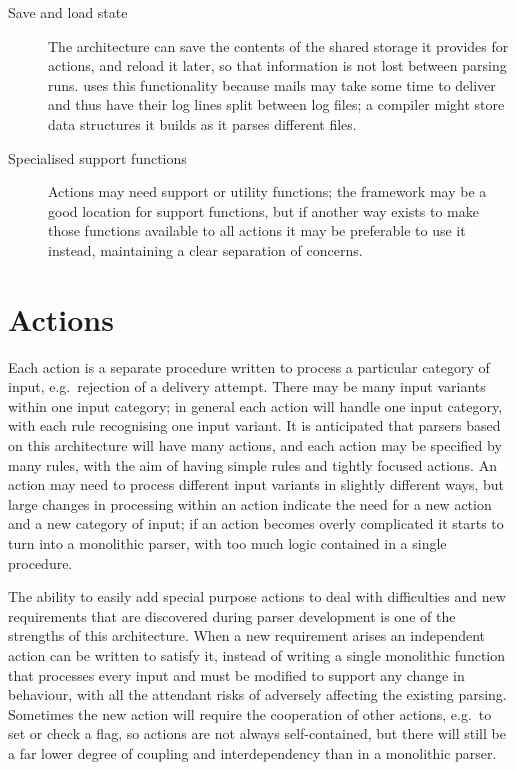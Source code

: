 \begin{description}
    \item [Save and load state]  The architecture can save the contents of
        the shared storage it provides for actions, and reload it later, so
        that information is not lost between parsing runs.  \parsername{}
        uses this functionality because mails may take some time to deliver
        and thus have their log lines split between log files; a compiler
        might store data structures it builds as it parses different files.

    \item [Specialised support functions]  Actions may need support or
        utility functions; the framework may be a good location for support
        functions, but if another way exists to make those functions
        available to all actions it may be preferable to use it instead,
        maintaining a clear separation of concerns.

\end{description}

\section{Actions}

\label{actions in architecture}

Each action is a separate procedure written to process a particular
category of input, e.g.\ rejection of a delivery attempt.  There may be
many input variants within one input category; in general each action will
handle one input category, with each rule recognising one input variant.
It is anticipated that parsers based on this architecture will have many
actions, and each action may be specified by many rules, with the aim of
having simple rules and tightly focused actions.  An action may need to
process different input variants in slightly different ways, but large
changes in processing within an action indicate the need for a new action
and a new category of input; if an action becomes overly complicated it
starts to turn into a monolithic parser, with too much logic contained in a
single procedure.

The ability to easily add special purpose actions to deal with difficulties
and new requirements that are discovered during parser development is one
of the strengths of this architecture.  When a new requirement arises an
independent action can be written to satisfy it, instead of writing a
single monolithic function that processes every input and must be modified
to support any change in behaviour, with all the attendant risks of
adversely affecting the existing parsing.  Sometimes the new action will
require the cooperation of other actions, e.g.\ to set or check a flag, so
actions are not always self-contained, but there will still be a far lower
degree of coupling and interdependency than in a monolithic parser.

